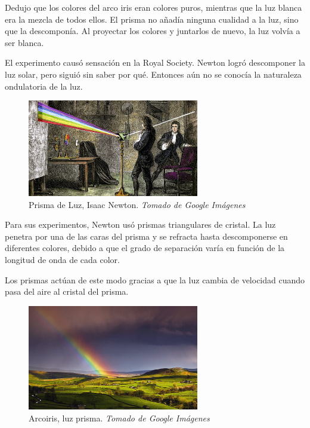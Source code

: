 \documentclass[journal]{IEEEtran}
\begin{document}
Dedujo que los colores del arco iris eran colores puros, mientras que la luz blanca era la mezcla de todos ellos. El prisma no añadía ninguna cualidad a la luz, sino que la descomponía. Al proyectar los colores y juntarlos de nuevo, la luz volvía a ser blanca.

El experimento causó sensación en la Royal Society. Newton logró descomponer la luz solar, pero siguió sin saber por qué. Entonces aún no se conocía la naturaleza ondulatoria de la luz.

\begin{center}
  \begin{figure}[h!]
  \includegraphics[width=75mm]{prisma_newton.jpg}
  \caption{Prisma de Luz, Isaac Newton. \emph{Tomado de Google Imágenes}}
  \end{figure}
\end{center}

Para sus experimentos, Newton usó prismas triangulares de cristal. La luz penetra por una de las caras del prisma y se refracta hasta descomponerse en diferentes colores, debido a que el grado de separación varía en función de la longitud de onda de cada color. 

Los prismas actúan de este modo gracias a que la luz cambia de velocidad cuando pasa del aire al cristal del prisma.

\begin{center}
  \begin{figure}[h!]
  \includegraphics[width=75mm]{arcoiris.jpg}
  \caption{Arcoiris, luz prisma. \emph{Tomado de Google Imágenes}}
  \end{figure}
\end{center}
\end{document}
